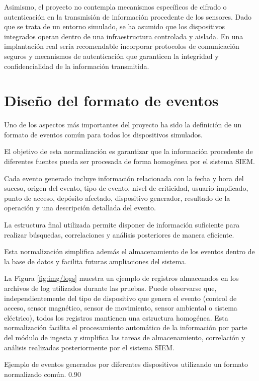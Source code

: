 Asimismo, el proyecto no contempla mecanismos específicos de cifrado o autenticación en la transmisión de información procedente de los sensores. Dado que se trata de un entorno simulado, se ha asumido que los dispositivos integrados operan dentro de una infraestructura controlada y aislada. En una implantación real sería recomendable incorporar protocolos de comunicación seguros y mecanismos de autenticación que garanticen la integridad y confidencialidad de la información transmitida.


\section{Diseño del formato de eventos}

Uno de los aspectos más importantes del proyecto ha sido la definición de un formato de eventos común para todos los dispositivos simulados.

El objetivo de esta normalización es garantizar que la información procedente de diferentes fuentes pueda ser procesada de forma homogénea por el sistema SIEM.

Cada evento generado incluye información relacionada con la fecha y hora del suceso, origen del evento, tipo de evento, nivel de criticidad, usuario implicado, punto de acceso, depósito afectado, dispositivo generador, resultado de la operación y una descripción detallada del evento.

La estructura final utilizada permite disponer de información suficiente para realizar búsquedas, correlaciones y análisis posteriores de manera eficiente.

Esta normalización simplifica además el almacenamiento de los eventos dentro de la base de datos y facilita futuras ampliaciones del sistema.

La Figura \ref{fig:img/logs} muestra un ejemplo de registros almacenados en los archivos de log utilizados durante las pruebas. Puede observarse que, independientemente del tipo de dispositivo que genera el evento (control de acceso, sensor magnético, sensor de movimiento, sensor ambiental o sistema eléctrico), todos los registros mantienen una estructura homogénea. Esta normalización facilita el procesamiento automático de la información por parte del módulo de ingesta y simplifica las tareas de almacenamiento, correlación y análisis realizadas posteriormente por el sistema SIEM.

{Ejemplo de eventos generados por diferentes dispositivos utilizando un formato normalizado común.}
{0.90}


